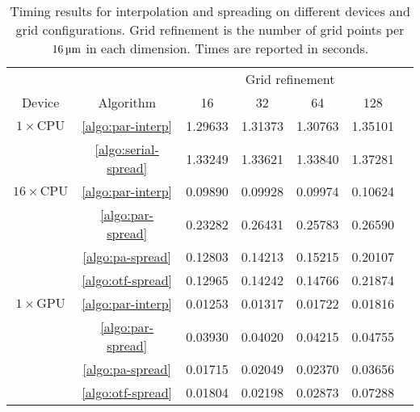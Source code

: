 

\begin{table}
    \begin{center}
    \bgroup
    \renewcommand{\arraystretch}{1.7}
    \begin{tabular}{ccccccc}
                                                                                              \toprule
                             &                          & \multicolumn{4}{c}{Grid refinement}   \\ \cline{3-6}
        Device               & Algorithm                & 16      & 32      & 64      & 128     \\ \midrule
        $1\times\text{CPU}$  & \ref{algo:par-interp}    & 1.29633 & 1.31373 & 1.30763 & 1.35101 \\
                             & \ref{algo:serial-spread} & 1.33249 & 1.33621 & 1.33840 & 1.37281 \\ \midrule
        $16\times\text{CPU}$ & \ref{algo:par-interp}    & 0.09890 & 0.09928 & 0.09974 & 0.10624 \\
                             & \ref{algo:par-spread}    & 0.23282 & 0.26431 & 0.25783 & 0.26590 \\
                             & \ref{algo:pa-spread}     & 0.12803 & 0.14213 & 0.15215 & 0.20107 \\
                             & \ref{algo:otf-spread}    & 0.12965 & 0.14242 & 0.14766 & 0.21874 \\ \midrule
        $1\times\text{GPU}$  & \ref{algo:par-interp}    & 0.01253 & 0.01317 & 0.01722 & 0.01816 \\
                             & \ref{algo:par-spread}    & 0.03930 & 0.04020 & 0.04215 & 0.04755 \\
                             & \ref{algo:pa-spread}     & 0.01715 & 0.02049 & 0.02370 & 0.03656 \\
                             & \ref{algo:otf-spread}    & 0.01804 & 0.02198 & 0.02873 & 0.07288 \\ \bottomrule
    \end{tabular}
    \egroup
    \end{center}
    \caption{%
        Timing results for interpolation and spreading on different devices and
        grid configurations. Grid refinement is the number of grid points per
        $16\um$ in each dimension. Times are reported in seconds.
    }
    \label{tab:grid-timing}
\end{table}

